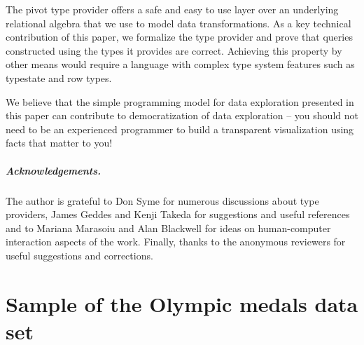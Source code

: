 \documentclass[a4paper,UKenglish]{lipics-v2016}
\theoremstyle{plain}
\theoremstyle{definition}
\begin{document}
The pivot type provider offers a safe and easy to use layer over an underlying relational algebra 
that we use to model data transformations. As a key technical contribution of this paper, we 
formalize the type provider and prove that queries constructed using the types it provides are 
correct. Achieving this property by other means would require a language with complex
type system features such as typestate and row types.

We believe that the simple programming model for data exploration presented in this paper can
contribute to democratization of data exploration -- you should not need to be an experienced 
programmer to build a transparent visualization using facts that matter to you!

\vspace{-0.25em}
\subparagraph{Acknowledgements.}
The author is grateful to Don Syme for numerous discussions about type providers, James
Geddes and Kenji Takeda for suggestions and useful references and to Mariana Marasoiu and
Alan Blackwell for ideas on human-computer interaction aspects of the work. Finally, thanks
to the anonymous reviewers for useful suggestions and corrections.



\appendix
\section{Sample of the Olympic medals data set}
\label{app:olympics-csv}
\end{document}
